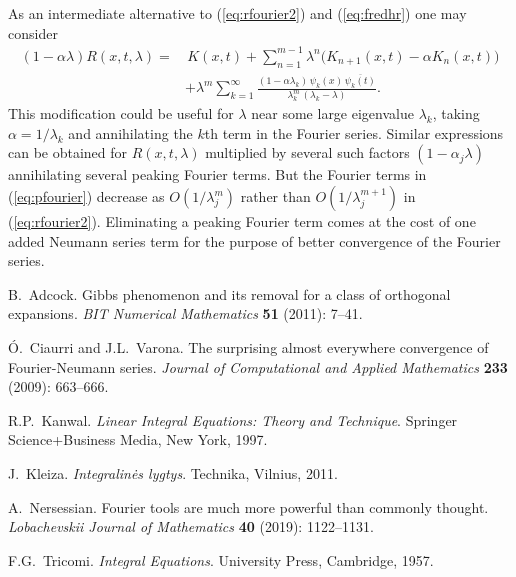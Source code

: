 \documentclass{article}
\begin{document}
As an intermediate alternative to (\ref{eq:rfourier2}) and (\ref{eq:fredhr}) one may consider
\begin{align} \label{eq:pfourier}
\left(1-\alpha\lambda\right) R(x,t,\lambda)= & \,
K(x,t)+\sum_{n=1}^{m-1} \lambda^{n} \big(K_{n+1}(x,t)-\alpha K_{n}(x,t) \big) \nonumber \\
 & +\lambda^m 
\sum_{k=1}^{\infty} \frac{(1-\alpha\lambda_k)\,\psi_k(x)\,\overline{\psi_k(t)}}{\lambda_k^m\,(\lambda_k-\lambda)}.
\end{align}
This modification could be useful for $\lambda$ near some large eigenvalue $\lambda_k$,
taking \mbox{$\alpha=1/\lambda_k$} and annihilating the $k$th term in the Fourier series. 
Similar expressions can be obtained for $R(x,t,\lambda)$ multiplied by several such factors $(1-\alpha_j\lambda)$
annihilating several peaking Fourier terms. But the Fourier terms in (\ref{eq:pfourier}) decrease as $O(1/\lambda_j^m)$
rather than $O(1/\lambda_j^{m+1})$ in (\ref{eq:rfourier2}). Eliminating a peaking Fourier term comes
at the cost of one added Neumann series term for the purpose of better convergence of the Fourier series.


\small
\begin{thebibliography}{99}

B.~Adcock. Gibbs phenomenon and its removal for a class of orthogonal expansions.
{\em BIT Numerical Mathematics} {\bf 51} (2011): 7--41.

\'O.~Ciaurri and J.L.~Varona. The surprising almost everywhere convergence of Fourier-Neumann series.
{\em Journal of Computational and Applied Mathematics} {\bf 233} (2009): 663--666.

R.P.~Kanwal. {\em Linear Integral Equations: Theory and Technique}.
Springer Science+Business Media, New York, 1997.

J.~Kleiza. {\em Integralin\.es lygtys}.
Technika, Vilnius, 2011.

A.~Nersessian. Fourier tools are much more powerful than commonly thought.
{\em Lobachevskii Journal of Mathematics} {\bf 40} (2019): 1122--1131. %

F.G.~Tricomi. {\em Integral Equations}.
University Press, Cambridge, 1957.
  
\end{thebibliography}  
\end{document}
